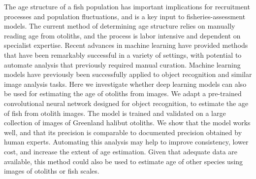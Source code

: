 \documentclass[10pt,letterpaper]{article}
\begin{document}
The age structure of a fish population has important implications for
recruitment processes and population fluctuations, and is a key input to
fisheries-assessment models. The current method of determining age structure relies on manually
reading age from otoliths, and the process is labor intensive and
dependent on specialist expertise. %
Recent advances in machine learning have provided methods that
have been remarkably successful in a variety of settings, with
potential to automate analysis that previously required manual
curation. Machine learning models have previously been successfully
applied to object recognition and similar image analysis tasks.  Here
we investigate whether deep learning models can also be used for
estimating the age of otoliths from images.%
 We adapt a pre-trained convolutional neural network designed for object
recognition, to estimate the age of fish from otolith images. The
model is trained and validated on a large collection of images 
of Greenland halibut otoliths.  %
We show that the model works well, and that its precision is comparable to 
documented precision obtained by human experts.   
% 
% 
Automating this analysis may help to improve consistency, lower cost, and increase the extent of age estimation. Given that adequate data are available, this method could also be used to estimate age of other species using images of otoliths or fish scales.



\end{document}
